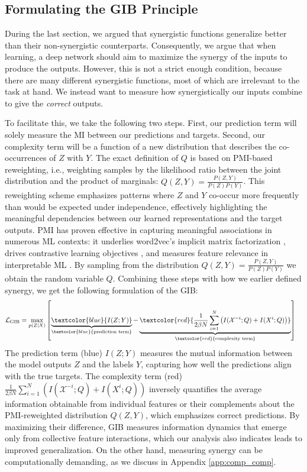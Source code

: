 \documentclass{article}
\theoremstyle{definition}
\theoremstyle{remark}
\begin{document}
\subsection{Formulating the GIB Principle}
During the last section, we argued that synergistic functions generalize better than their non-synergistic counterparts. Consequently, we argue that when learning, a deep network should aim to maximize the synergy of the inputs to produce the outputs. However, this is not a strict enough condition, because there are many different synergistic functions, most of which are irrelevant to the task at hand. We instead want to measure how synergistically our inputs combine to give the \emph{correct} outputs.

To facilitate this, we take the following two steps. First, our prediction term will solely measure the MI between our predictions and targets. Second, our complexity term will be a function of a new distribution that describes the co-occurrences of $Z$ with $Y$. The exact definition of $Q$ is based on PMI-based reweighting, i.e., weighting samples by the likelihood ratio between the joint distribution and the product of marginals: $Q(Z,Y) = \frac{P(Z,Y)}{P(Z)P(Y)}$. This reweighting scheme emphasizes patterns where $Z$ and $Y$ co-occur more frequently than would be expected under independence, effectively highlighting the meaningful dependencies between our learned representations and the target outputs. PMI has proven effective in capturing meaningful associations in numerous ML contexts: it underlies word2vec's implicit matrix factorization \citep{levy2014neural}, drives contrastive learning objectives \citep{vandenoord2018}, and measures feature relevance in interpretable ML \citep{bouma2009normalized}. By sampling from the distribution $Q(Z,Y) = \frac{P(Z,Y)}{P(Z)P(Y)}$ we obtain the random variable $Q$. Combining these steps with how we earlier defined synergy, we get the following formulation of the GIB:
\begin{align}
\mathcal{L}_{\text{GIB}} &= \max_{p(Z|X)} \left[ \underbrace{\textcolor{blue}{I(Z;Y)}}_{\textcolor{blue}{\text{prediction term}}} - \underbrace{\textcolor{red}{\frac{1}{2\beta N} \sum_{i=1}^{N} \left(I(\mathcal{X}^{-i}; Q) + I(X^i; Q)\right)}}_{\textcolor{red}{\text{complexity term}}} \right]
\end{align}
%
The prediction term (blue) $I(Z;Y)$ measures the mutual information between the model outputs $Z$ and the labels $Y$, capturing how well the predictions align with the true targets. The complexity term (red) $\frac{1}{2\beta N} \sum_{i=1}^{N} \left(I(\mathcal{X}^{-i}; Q) + I(X^i; Q)\right)$ inversely quantifies the average information obtainable from individual features or their complements about the PMI-reweighted distribution $Q(Z,Y)$, which emphasizes correct predictions. By maximizing their difference, GIB measures information dynamics that emerge only from collective feature interactions, which our analysis also indicates leads to improved generalization. On the other hand, measuring synergy can be computationally demanding, as we discuss in Appendix \ref{app:comp_comp}.
\end{document}
